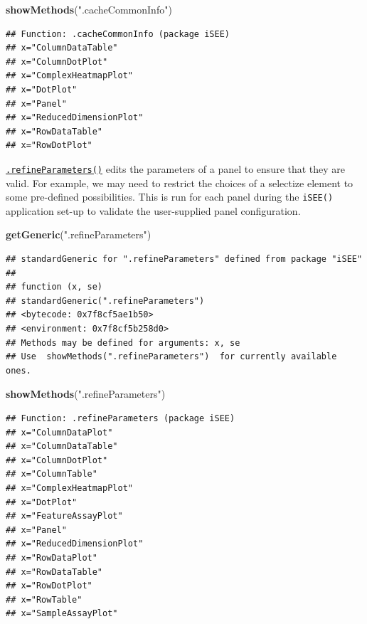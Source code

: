 \documentclass[
]{book}
\newenvironment{Shaded}{\begin{snugshade}}{\end{snugshade}}
\newcommand{\KeywordTok}[1]{\textcolor[rgb]{0.13,0.29,0.53}{\textbf{#1}}}
\newcommand{\NormalTok}[1]{#1}
\newcommand{\StringTok}[1]{\textcolor[rgb]{0.31,0.60,0.02}{#1}}
\begin{document}
\begin{Shaded}
\begin{Highlighting}[]
\KeywordTok{showMethods}\NormalTok{(}\StringTok{".cacheCommonInfo"}\NormalTok{)}
\end{Highlighting}
\end{Shaded}

\begin{verbatim}
## Function: .cacheCommonInfo (package iSEE)
## x="ColumnDataTable"
## x="ColumnDotPlot"
## x="ComplexHeatmapPlot"
## x="DotPlot"
## x="Panel"
## x="ReducedDimensionPlot"
## x="RowDataTable"
## x="RowDotPlot"
\end{verbatim}

\href{https://isee.github.io/iSEE/reference/setup-generics.html}{\texttt{.refineParameters()}} edits the parameters of a panel to ensure that they are valid.
For example, we may need to restrict the choices of a selectize element to some pre-defined possibilities.
This is run for each panel during the \texttt{iSEE()} application set-up to validate the user-supplied panel configuration.

\begin{Shaded}
\begin{Highlighting}[]
\KeywordTok{getGeneric}\NormalTok{(}\StringTok{".refineParameters"}\NormalTok{)}
\end{Highlighting}
\end{Shaded}

\begin{verbatim}
## standardGeneric for ".refineParameters" defined from package "iSEE"
## 
## function (x, se) 
## standardGeneric(".refineParameters")
## <bytecode: 0x7f8cf5ae1b50>
## <environment: 0x7f8cf5b258d0>
## Methods may be defined for arguments: x, se
## Use  showMethods(".refineParameters")  for currently available ones.
\end{verbatim}

\begin{Shaded}
\begin{Highlighting}[]
\KeywordTok{showMethods}\NormalTok{(}\StringTok{".refineParameters"}\NormalTok{)}
\end{Highlighting}
\end{Shaded}

\begin{verbatim}
## Function: .refineParameters (package iSEE)
## x="ColumnDataPlot"
## x="ColumnDataTable"
## x="ColumnDotPlot"
## x="ColumnTable"
## x="ComplexHeatmapPlot"
## x="DotPlot"
## x="FeatureAssayPlot"
## x="Panel"
## x="ReducedDimensionPlot"
## x="RowDataPlot"
## x="RowDataTable"
## x="RowDotPlot"
## x="RowTable"
## x="SampleAssayPlot"
\end{verbatim}
\end{document}

